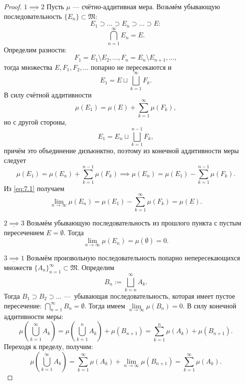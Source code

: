 \begin{proof}\tab

    $\underline{1 \implies 2}$ Пусть $\mu$ — счётно-аддитивная мера. Возьмём убывающую последовательность $\{E_n\} \subset \mathfrak{M}:$
    \[E_1 \supset \dots \supset E_n \supset \dots \supset E:\]
    \[\bigcap\limits_{n=1}^{\infty}E_n = E.\]
    Определим разности:
    \[F_1 = E_1 \setminus E_2, \dots, F_n = E_n \setminus E_{n+1}, \dots,\]
    тогда множества $E, F_1, F_2, \dots$ попарно не пересекаются и
    \[E_1 = E \sqcup \bigsqcup\limits_{k=1}^{\infty}F_k.\]
    В силу счётной аддитивности
    \begin{equation}
        \mu(E_1) = \mu(E) + \sum\limits_{k=1}^{\infty} \mu(F_k),\label{eq:7.1}
    \end{equation}
    но с другой стороны,
    \[E_1 = E_n \sqcup \bigsqcup\limits_{k=1}^{n-1}F_k,\]
    причём это объединение дизъюнктно, поэтому из конечной аддитивности меры следует
    \[\mu(E_1) = \mu(E_n) + \sum\limits_{k=1}^{n-1}\mu(F_k)
    \implies
    \mu(E_n) = \mu(E_1) - \sum\limits_{k=1}^{n-1}\mu(F_k).\]
    Из \eqref{eq:7.1} получаем
    \[\lim\limits_{n \to \infty} \mu(E_n) = \mu(E_1) - \sum\limits_{k=1}^{\infty}\mu(F_k) = \mu(E).\]
    
    \noindent$\underline{2 \implies 3}$ Возьмём убывающую последовательность из прошлого пункта с пустым пересечением $E = \emptyset$. Тогда
    \[\lim\limits_{n \to \infty} \mu(E_n) = \mu(\emptyset) = 0.\]

    \noindent$\underline{3 \implies 1}$ Возьмём произвольную последовательность попарно непересекающихся множеств $\{A_n\}_{n=1}^\infty \subset \mathfrak{M}$.
    Определим
    \[B_n := \bigsqcup\limits_{k=n}^{\infty}A_k.\]
    Тогда $B_1 \supset B_2 \supset \dots$ — убывающая последовательность, которая имеет пустое пересечение: $\bigcap\limits_{n=1}^{\infty}B_n = \emptyset$.
    Тогда имеем $\lim\limits_{n \to \infty}\mu(B_n) = 0.$
    В силу конечной аддитивности меры:
    \[\mu\left(\bigcup\limits_{k=1}^{\infty}A_k\right) = \mu\left(\bigcup\limits_{k=1}^{n}A_k\right) + \mu(B_{n+1})
    =
    \sum\limits_{k=1}^{n}\mu(A_k) + \mu(B_{n+1}).\]
    Переходя к пределу, получим:
    \[\mu\left(\bigcup\limits_{k=1}^{\infty}A_k\right) = \sum\limits_{k=1}^{\infty} \mu(A_k) + \lim\limits_{n\to \infty}\mu(B_{n+1}) = \sum\limits_{k=1}^{\infty}\mu(A_k).\]   
\end{proof} 

